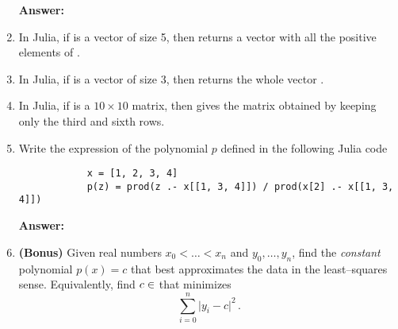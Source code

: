 \documentclass[a4paper]{article}
\begin{document}
\begin{enumerate}
        \textbf{Answer:}
        \vspace{1.5cm}

    \item
        In Julia, if  is a vector of size 5,
        then  returns a vector with all the positive elements of .

    \item
        In Julia, if  is a vector of size 3,
        then  returns the whole vector .

    \item
        In Julia, if  is a $10\times10$ matrix,
        then  gives the matrix obtained by keeping only the third and sixth rows.

    \item
        Write the expression of the polynomial $p$ defined in the following Julia code 
        \begin{verbatim}
            x = [1, 2, 3, 4]
            p(z) = prod(z .- x[[1, 3, 4]]) / prod(x[2] .- x[[1, 3, 4]])
        \end{verbatim}

        \textbf{Answer:}
        \vspace{1.5cm}


    \item
        \textbf{(Bonus)}
        Given real numbers $x_0 < \dotsc < x_n$ and $y_0, \dotsc, y_n$,
        find the \emph{constant} polynomial $p(x) = c$ that best approximates the data in the least–squares sense.
        Equivalently, find $c \in \real$ that minimizes
        \[
            \sum_{i=0}^{n} \lvert y_i - c \rvert^2 \, .
        \]

\end{enumerate}
\end{document}
